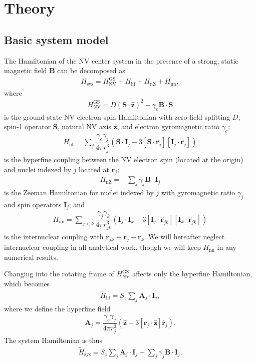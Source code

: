 \documentclass[twocolumn]{revtex4-1}
\renewcommand{\t}{\text} %
\newcommand{\f}[2]{\dfrac{#1}{#2}} %
\newcommand{\p}[1]{\left(#1\right)} %
\renewcommand{\sp}[1]{\left[#1\right]} %
\renewcommand{\v}{\bm} %
\newcommand{\uv}[1]{\hat{\v{#1}}} %
\renewcommand{\c}{\cdot} %
\newcommand{\NV}{\t{NV}}
\begin{document}
\tableofcontents{}

\section{Theory}

\subsection{Basic system model}

The Hamiltonian of the NV center system in the presence of a strong,
static magnetic field $\v B$ can be decomposed as
\begin{align}
  H_\t{sys} = H_\NV^\t{GS} + H_\t{hf} + H_\t{nZ}  + H_\t{nn},
\end{align}
where
\begin{align}
  H_\NV^\t{GS} = D\p{\v S\c\uv z}^2 - \gamma_e\v B\c\v S
\end{align}
is the ground-state NV electron spin Hamiltonian with zero-field
splitting $D$, spin-1 operator $\v S$, natural NV axis $\uv z$, and
electron gyromagnetic ratio $\gamma_e$;
\begin{align}
  H_\t{hf} = \sum_j\f{\gamma_e\gamma_j}{4\pi r_j^3}
  \p{\v S\c\v I_j-3\sp{\v S\c\uv r_j}\sp{\v I_j\c\uv r_j}}
\end{align}
is the hyperfine coupling between the NV electron spin (located at the
origin) and nuclei indexed by $j$ located at $\v r_j$;
\begin{align}
  H_\t{nZ} = -\sum_j\gamma_j\v B\c\v I_j
\end{align}
is the Zeeman Hamiltonian for nuclei indexed by $j$ with gyromagnetic
ratio $\gamma_j$ and spin operators $\v I_j$; and
\begin{align}
  H_\t{nn} = \sum_{j<k}\f{\gamma_j\gamma_k}{4\pi r_{jk}^3}
  \p{\v I_j\c\v I_k-3\sp{\v I_j\c\uv r_{jk}}\sp{\v I_k\c\uv r_{jk}}}
\end{align}
is the internuclear coupling with $\v r_{jk}\equiv\v r_j-\v r_k$. We
will hereafter neglect internuclear coupling in all analytical work,
though we will keep $H_\t{nn}$ in any numerical results.

Changing into the rotating frame of $H_\NV^\t{GS}$ affects only the
hyperfine Hamiltonian, which becomes
\begin{align}
  \tilde H_\t{hf} = S_z\sum_j \v A_j\c\v I_j,
\end{align}
where we define the hyperfine field
\begin{align}
  \v A_j = \f{\gamma_e\gamma_j}{4\pi r_j^3}\p{\uv z - 3\sp{\uv
  r_j\c\uv z}\uv r_j}.
\end{align}
The system Hamiltonian is thus
\begin{align}
  \tilde H_\t{sys} = S_z\sum_j \v A_j\c\v I_j
  -\sum_j\gamma_j\v B\c\v I_j.
\end{align}
\end{document}
